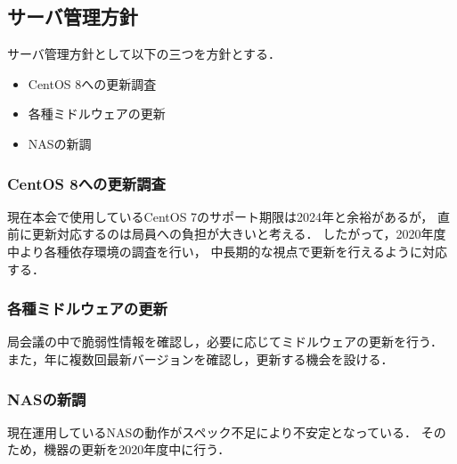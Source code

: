 \subsection*{サーバ管理方針}

サーバ管理方針として以下の三つを方針とする．
\begin{itemize}
    \item CentOS 8への更新調査
    \item 各種ミドルウェアの更新
    \item NASの新調
\end{itemize}

\subsubsection*{CentOS 8への更新調査}
現在本会で使用しているCentOS 7のサポート期限は2024年と余裕があるが，
直前に更新対応するのは局員への負担が大きいと考える．
したがって，2020年度中より各種依存環境の調査を行い，
中長期的な視点で更新を行えるように対応する．

\subsubsection*{各種ミドルウェアの更新}
局会議の中で脆弱性情報を確認し，必要に応じてミドルウェアの更新を行う．
また，年に複数回最新バージョンを確認し，更新する機会を設ける．

\subsubsection*{NASの新調}
現在運用しているNASの動作がスペック不足により不安定となっている．
そのため，機器の更新を2020年度中に行う．
